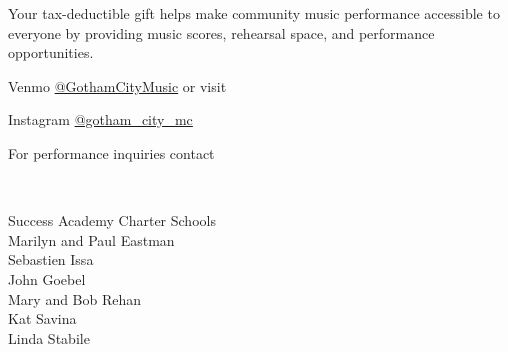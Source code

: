 \documentclass{article}[10pt]
\begin{document}
\begin{center}
\begin{minipage}{4in}
            \begin{center}
            {\textbf{}}
            \end{center}

            \vspace{-0.1in}

            \begin{small}
                Your tax-deductible gift helps make community music performance accessible to everyone by providing music scores, rehearsal space, and performance opportunities.\\
            \end{small}


            Venmo \href{https://account.venmo.com/u/GothamCityMusic}{@GothamCityMusic} or visit \textbf{}

            \begin{center}
            {\textbf{}}

                \faInstagram{}{}  Instagram  \href{https://www.instagram.com/gotham_city_mc/}{@gotham\_city\_mc}


                For performance inquiries contact
                    {\textbf{}}
            \end{center}

            \begin{center}
            {\textbf{}}
                \\

                \begin{small}
                    \vspace{-0.11in}
                    \begin{multicols*}{2}
                    {Success Academy Charter Schools}
                        \\
                        Marilyn and Paul Eastman\\
                        Sebastien Issa\\
                        John Goebel\\
                        Mary and Bob Rehan\\
                        Kat Savina\\
                        Linda Stabile
                    \end{multicols*}
                \end{small}
            \end{center}

        \end{minipage}

    \end{center}
\end{document}
